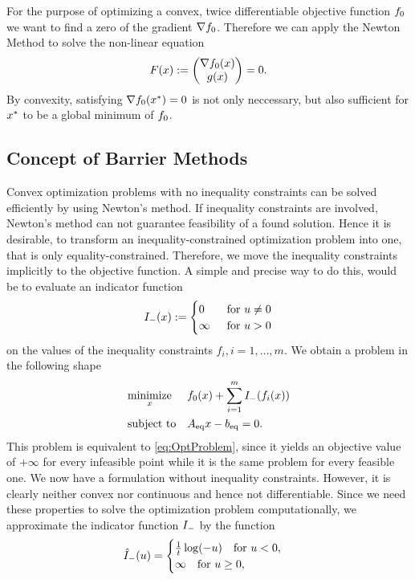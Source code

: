 For the purpose of optimizing a convex, twice differentiable objective function $ f_0 $ we want to find a zero of the gradient $ \nabla f_0 $. Therefore we can apply the Newton Method to solve the non-linear equation \[ F(x) := \begin{pmatrix} {\nabla f_0(x)} \\ {g(x)} \end{pmatrix} = 0. \] By convexity, satisfying $ \nabla f_0 (x^*) = 0$ is not only neccessary, but also sufficient for $ x^* $ to be a global minimum of $ f_0 $.\\


\subsection{Concept of Barrier Methods}
Convex optimization problems with no inequality constraints can  be solved efficiently by using Newton's method. If inequality constraints are involved, Newton's method can not guarantee feasibility of a found solution. Hence it is desirable, to transform an inequality-constrained optimization problem into one, that is only equality-constrained. Therefore, we move the inequality constraints implicitly to the objective function.
A simple and precise way to do this, would be to evaluate an  indicator function  
\begin{align}
	{I}_{\mathrm{-}} (x) :=
	\begin{cases}
		0 \quad &\text{for } u \neq 0\\
		\infty &\text{for } u > 0
	\end{cases}
\end{align}
on the values of the inequality constraints $ f_i, i=1,\dots,m $. We obtain a problem in the following shape
\begin{align}
	\begin{aligned}
	& \underset{x}{\text{minimize}}
	& & f_0(x) + \sum_{i=1}^{m} {I}_{\mathrm{-}}(f_i(x))\\
	& \text{subject to}
	& & {A}_{\mathrm{eq}} x - {b}_{\mathrm{eq}} = 0.
	\end{aligned} \label{eq:ifctProblem}
\end{align}
This problem is equivalent to \eqref{eq:OptProblem}, since it yields an objective value of $ +\infty  $ for every infeasible point while it is the same problem for every feasible one. We now have a formulation without inequality constraints. However, it is clearly neither convex nor continuous and hence not differentiable. Since we need these properties to solve the optimization problem computationally, we approximate the indicator function $ {I}_{\mathrm{-}} $ by the function
\begin{equation}
	{\hat{I}}_{\mathrm{-}} (u) =
	\begin{cases}
	 \frac{1}{t}\log(-u) \quad \text{for } u < 0,\\
	 \infty \quad \text{for } u\geq 0,
	\end{cases}
\end{equation}
